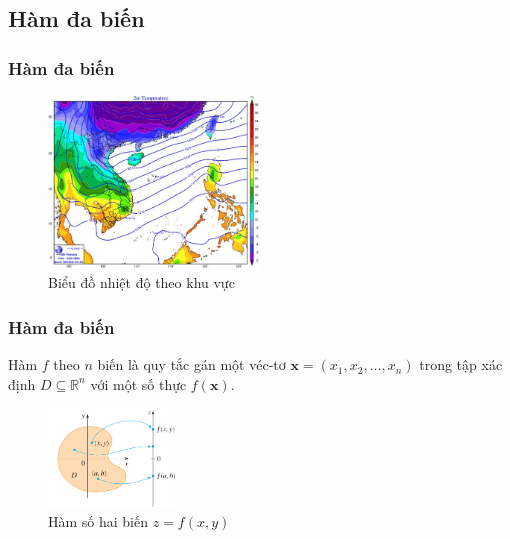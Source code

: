 \subsection{Hàm đa biến}
\begin{frame}
\frametitle{Hàm đa biến}
\begin{figure}
    \centering
    \includegraphics[width=0.5\textwidth]{Content/Figure/TemperatureGraph.jpg}
    \caption{Biểu đồ nhiệt độ theo khu vực}
\end{figure}
\end{frame}

\begin{frame}
\frametitle{Hàm đa biến}
\begin{tcolorbox}[colback=blue!10!, colframe=blue!50!black, title=Định nghĩa]
    Hàm \(f\) theo \(n\) biến là quy tắc gán một véc-tơ \( \mathbf{x} = (x_1, x_2, \ldots, x_n) \) trong tập xác định \(D \subseteq \mathbb{R}^n\) với một số thực \(f(\mathbf{x})\).
\end{tcolorbox}
\begin{figure}
    \centering
    \includegraphics[width=0.3\textwidth]{Content/Figure/MultiVariable.png}
    \caption{Hàm số hai biến \(z = f(x, y)\)}
\end{figure}
\end{frame}

